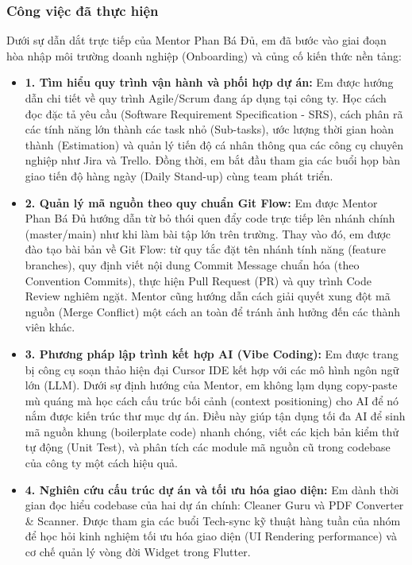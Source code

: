 \documentclass[12pt, a4paper]{article}
\begin{document}
\subsubsection{Công việc đã thực hiện}
Dưới sự dẫn dắt trực tiếp của Mentor Phan Bá Đủ, em đã bước vào giai đoạn hòa nhập môi trường doanh nghiệp (Onboarding) và củng cố kiến thức nền tảng:
\begin{itemize}
    \item \textbf{1. Tìm hiểu quy trình vận hành và phối hợp dự án:}
    Em được hướng dẫn chi tiết về quy trình Agile/Scrum đang áp dụng tại công ty. Học cách đọc đặc tả yêu cầu (Software Requirement Specification - SRS), cách phân rã các tính năng lớn thành các task nhỏ (Sub-tasks), ước lượng thời gian hoàn thành (Estimation) và quản lý tiến độ cá nhân thông qua các công cụ chuyên nghiệp như Jira và Trello. Đồng thời, em bắt đầu tham gia các buổi họp bàn giao tiến độ hàng ngày (Daily Stand-up) cùng team phát triển.
    
    \item \textbf{2. Quản lý mã nguồn theo quy chuẩn Git Flow:}
    Em được Mentor Phan Bá Đủ hướng dẫn từ bỏ thói quen đẩy code trực tiếp lên nhánh chính (master/main) như khi làm bài tập lớn trên trường. Thay vào đó, em được đào tạo bài bản về Git Flow: từ quy tắc đặt tên nhánh tính năng (feature branches), quy định viết nội dung Commit Message chuẩn hóa (theo Convention Commits), thực hiện Pull Request (PR) và quy trình Code Review nghiêm ngặt. Mentor cũng hướng dẫn cách giải quyết xung đột mã nguồn (Merge Conflict) một cách an toàn để tránh ảnh hưởng đến các thành viên khác.
    
    \item \textbf{3. Phương pháp lập trình kết hợp AI (Vibe Coding):}
    Em được trang bị công cụ soạn thảo hiện đại Cursor IDE kết hợp với các mô hình ngôn ngữ lớn (LLM). Dưới sự định hướng của Mentor, em không lạm dụng copy-paste mù quáng mà học cách cấu trúc bối cảnh (context positioning) cho AI để nó nắm được kiến trúc thư mục dự án. Điều này giúp tận dụng tối đa AI để sinh mã nguồn khung (boilerplate code) nhanh chóng, viết các kịch bản kiểm thử tự động (Unit Test), và phân tích các module mã nguồn cũ trong codebase của công ty một cách hiệu quả.
    
    \item \textbf{4. Nghiên cứu cấu trúc dự án và tối ưu hóa giao diện:}
    Em dành thời gian đọc hiểu codebase của hai dự án chính: Cleaner Guru và PDF Converter \& Scanner. Được tham gia các buổi Tech-sync kỹ thuật hàng tuần của nhóm để học hỏi kinh nghiệm tối ưu hóa giao diện (UI Rendering performance) và cơ chế quản lý vòng đời Widget trong Flutter.
\end{itemize}
\end{document}
